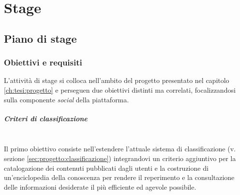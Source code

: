 \chapter{Stage}
\label{ch:tesi:stage}

\section{Piano di stage}
\label{sec:tesi:stage:piano}

\subsection{Obiettivi e requisiti}
\label{sec:tesi:stage:piano:obiettivi}
L'attività di stage si colloca nell'ambito del progetto presentato nel capitolo \ref{ch:tesi:progetto} e perseguen due obiettivi distinti ma correlati, focalizzandosi sulla componente \textit{social} della piattaforma.



\paragraph{Criteri di classificazione} \hfill \\
Il primo obiettivo consiste nell'estendere l'attuale sistema di classificazione (v. sezione \ref{sec:progetto:classificazione}) integrandovi un criterio aggiuntivo per la catalogazione dei contenuti pubblicati dagli utenti e la costruzione di un'enciclopedia della conoscenza per rendere il reperimento e la consultazione delle informazioni desiderate il più efficiente ed agevole possibile.

